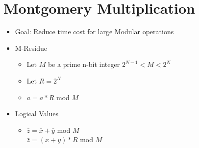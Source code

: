 \section{Montgomery Multiplication}
\begin{itemize}
\item Goal: Reduce time cost for large Modular operations
\item M-Residue
    \begin{itemize}
    \item Let $M$ be a prime n-bit integer $2^{N-1} < M < 2^N$
    \item Let $R = 2^N$
    \item $\bar{a} = a*R$ mod $M$
    \end{itemize}
\item Logical Values
    \begin{itemize}
    \item $\bar{z} = \bar{x} + \bar{y}$ mod $M$
        \\$\bar{z} = (x+y)*R$ mod $M$
    \end{itemize}
\end{itemize}